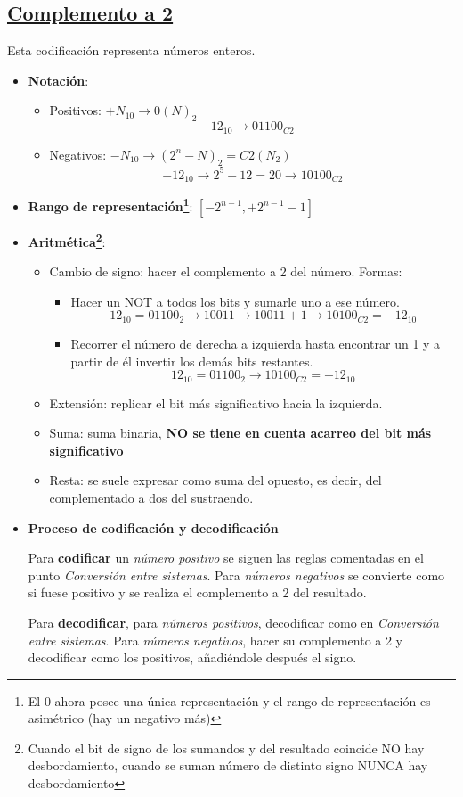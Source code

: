 \documentclass[a4paper,10pt]{book}
\begin{document}
\subsection*{\underline{Complemento a 2}}
Esta codificación representa números enteros.
\begin{itemize}
\item \textbf{Notación}:
	\begin{itemize}
	\item Positivos: $+N_{10}\rightarrow 0(N)_2$
	$$12_{10}\rightarrow 01100_{C2}$$
	\item Negativos: $-N_{10}\rightarrow (2^n-N)_2=C2(N_2)$
	$$-12_{10}\rightarrow 2^5-12=20 \rightarrow 10100_{C2}$$
	\end{itemize}
\item \textbf{Rango de representación\footnote{El 0 ahora posee una única representación y el rango de representación es asimétrico (hay un negativo más)}}: $[-2^{n-1},+2^{n-1}-1]$
\item \textbf{Aritmética\footnote{Cuando el bit de signo de los sumandos y del resultado coincide NO hay desbordamiento, cuando se suman número de distinto signo NUNCA hay desbordamiento}}:
	\begin{itemize}
	\item Cambio de signo: hacer el complemento a 2 del número. Formas:
		\begin{itemize}
	\item Hacer un NOT a todos los bits y sumarle uno a ese número.
$$12_{10}=01100_2 \rightarrow 10011 \rightarrow 10011+1 \rightarrow 10100_{C2}=-12_{10}$$
	\item Recorrer el número de derecha a izquierda hasta encontrar un 1 y a partir de él invertir los demás bits restantes.
$$12_{10}=01100_2 \rightarrow 10100_{C2}=-12_{10}$$
		\end{itemize}			

	\item Extensión: replicar el bit más significativo hacia la izquierda.
	\item Suma: suma binaria, \textbf{NO se tiene en cuenta acarreo del bit más significativo}
	\item Resta: se suele expresar como suma del opuesto, es decir, del complementado a dos del sustraendo.
	\end{itemize}
\item \textbf{Proceso de codificación y decodificación}\par
Para \textbf{codificar} un \emph{número positivo} se siguen las reglas comentadas en el punto \textit{Conversión entre sistemas}. Para \emph{números negativos} se convierte como si fuese positivo y se realiza el complemento a 2 del resultado.\par
Para \textbf{decodificar}, para \emph{números positivos}, decodificar como en \textit{Conversión entre sistemas}. Para \emph{números negativos}, hacer su complemento a 2 y decodificar como los positivos, añadiéndole después el signo.
\end{itemize}
\end{document}
